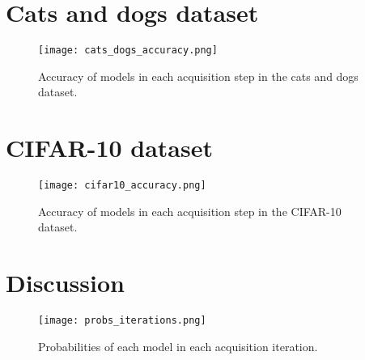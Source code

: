 %
%

\section{Cats and dogs dataset}


\begin{figure}[H]
    \centering
    \texttt{[image: cats\_dogs\_accuracy.png]}
    \caption{Accuracy of models in each acquisition step in the cats and dogs dataset.}
    \label{fig:cats_dogs_comparison_active_learning_random}
\end{figure}


\section{CIFAR-10 dataset}

\begin{figure}[H]
    \centering
    \texttt{[image: cifar10\_accuracy.png]}
    \caption{Accuracy of models in each acquisition step in the CIFAR-10 dataset.}
    \label{fig:cifar10_comparison_active_learning_random}
\end{figure}

\section{Discussion}

\begin{figure}[H]
    \centering
    \texttt{[image: probs\_iterations.png]}
    \caption{Probabilities of each model in each acquisition iteration.}
    \label{fig:probs_iterations}
\end{figure}

